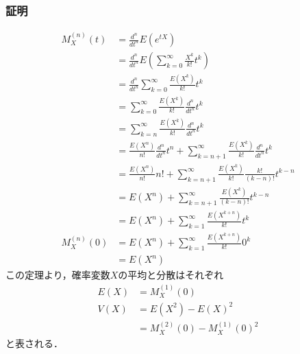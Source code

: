 \documentclass[dvipdfmx]{jsarticle}
\begin{document}
 \subsubsection{証明}
 \begin{align}
  M_X^{\left(n\right)}\left(t\right)&=\frac{d^n}{dt^n}E\left(e^{tX}\right)\nonumber\\
  &=\frac{d^n}{dt^n}E\left(\sum_{k=0}^\infty \frac{X^k}{k!}t^k\right)\nonumber\\
  &=\frac{d^n}{dt^n}\sum_{k=0}^\infty \frac{E\left(X^k\right)}{k!}t^k\nonumber\\
  &=\sum_{k=0}^\infty \frac{E\left(X^k\right)}{k!}\frac{d^n}{dt^n}t^k\nonumber\\
  &=\sum_{k=n}^\infty \frac{E\left(X^k\right)}{k!}\frac{d^n}{dt^n}t^k\nonumber\\
  &=\frac{E\left(X^n\right)}{n!}\frac{d^n}{dt^n}t^n+\sum_{k=n+1}^\infty \frac{E\left(X^k\right)}{k!}\frac{d^n}{dt^n}t^k\nonumber\\
  &=\frac{E\left(X^n\right)}{n!}n!+\sum_{k=n+1}^\infty \frac{E\left(X^k\right)}{k!}\frac{k!}{\left(k-n\right)!}t^{k-n}\nonumber\\
  &=E\left(X^n\right)+\sum_{k=n+1}^\infty \frac{E\left(X^k\right)}{\left(k-n\right)!}t^{k-n}\nonumber\\
  &=E\left(X^n\right)+\sum_{k=1}^\infty \frac{E\left(X^{k+n}\right)}{k!}t^k\nonumber\\
  M_X^{\left(n\right)}\left(0\right)&=E\left(X^n\right)+\sum_{k=1}^\infty \frac{E\left(X^{k+n}\right)}{k!}0^k\nonumber\\
  &=E\left(X^n\right)
 \end{align}
この定理より，確率変数$X$の平均と分散はそれぞれ
 \begin{align}
  E\left(X\right)&=M_X^{\left(1\right)}\left(0\right)\\
  V\left(X\right)&=E\left(X^2\right)-E\left(X\right)^2\nonumber\\
  &=M_X^{\left(2\right)}\left(0\right)-M_X^{\left(1\right)}\left(0\right)^2
 \end{align}
と表される．
\end{document}
